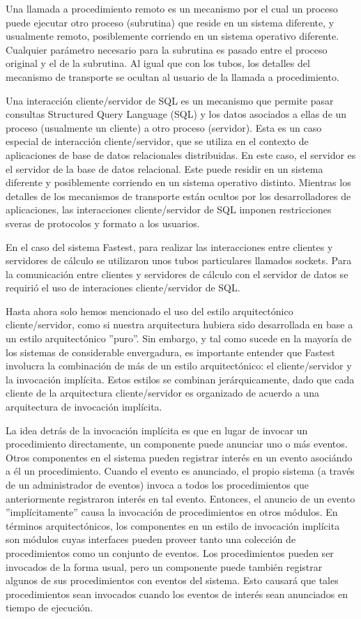 \documentclass[a4paper,11pt]{article}
\begin{document}
Una llamada a procedimiento remoto es un mecanismo por el cual un proceso puede ejecutar otro proceso (subrutina) que reside en un sistema diferente, y usualmente remoto, posiblemente corriendo en un sistema operativo diferente. Cualquier parámetro necesario para la subrutina es pasado entre el proceso original y el de la subrutina. Al igual que con los tubos, los detalles del mecanismo de transporte se ocultan al usuario de la llamada a procedimiento.

Una interacción cliente/servidor de SQL es un mecanismo que permite pasar consultas Structured Query Language (SQL) y los datos asociados a ellas de un proceso (usualmente un cliente) a otro proceso (servidor). Esta es un caso especial de interacción cliente/servidor, que se utiliza en el contexto de aplicaciones de base de datos relacionales distribuidas. En este caso, el servidor es el servidor de la base de datos relacional. Este puede residir en un sistema diferente y posiblemente corriendo en un sistema operativo distinto. Mientras los detalles de los mecanismos de transporte están ocultos por los desarrolladores de aplicaciones, las interacciones cliente/servidor de SQL imponen restricciones sveras de protocolos y formato a los usuarios.

En el caso del sistema Fastest, para realizar las interacciones entre clientes y servidores de cálculo se utilizaron unos tubos particulares llamados sockets. Para la comunicación entre clientes y servidores de cálculo con el servidor de datos se requirió el uso de interaciones cliente/servidor de SQL.

Hasta ahora solo hemos mencionado el uso del estilo arquitectónico cliente/servidor, como si nuestra arquitectura hubiera sido desarrollada en base a un estilo arquitectónico ''puro''. Sin embargo, y tal como sucede en la mayoría de los sistemas de considerable envergadura, es importante entender que Fastest involucra la combinación de más de un estilo arquitectónico: el cliente/servidor y la invocación implícita. Estos estilos se combinan jerárquicamente, dado que cada cliente de la arquitectura cliente/servidor es organizado de acuerdo a una arquitectura de invocación implícita.

La idea detrás de la invocación implícita es que en lugar de invocar un procedimiento directamente, un componente puede anunciar uno o más eventos. Otros componentes en el sistema pueden registrar interés en un evento asociándo a él un procedimiento. Cuando el evento es anunciado, el propio sistema (a través de un administrador de eventos) invoca a todos los procedimientos que anteriormente registraron interés en tal evento. Entonces, el anuncio de un evento ''implícitamente'' causa la invocación de procedimientos en otros módulos. En términos arquitectónicos, los componentes en un estilo de invocación implícita son módulos cuyas interfaces pueden proveer tanto una colección de procedimientos como un conjunto de eventos. Los procedimientos pueden ser invocados de la forma usual, pero un componente puede también registrar algunos de sus procedimientos con eventos del sistema. Esto causará que tales procedimientos sean invocados cuando los eventos de interés sean anunciados en tiempo de ejecución.
\end{document}
